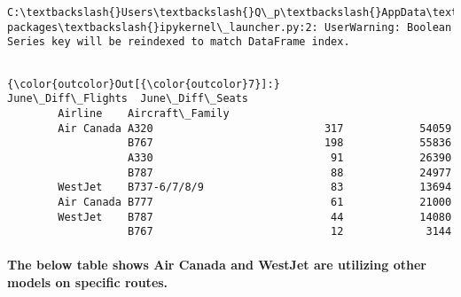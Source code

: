 \documentclass[11pt]{article}
\begin{document}
    \begin{Verbatim}[commandchars=\\\{\}]
C:\textbackslash{}Users\textbackslash{}Q\_p\textbackslash{}AppData\textbackslash{}Local\textbackslash{}Continuum\textbackslash{}anaconda3\textbackslash{}lib\textbackslash{}site-packages\textbackslash{}ipykernel\_launcher.py:2: UserWarning: Boolean Series key will be reindexed to match DataFrame index.
  

    \end{Verbatim}

\begin{Verbatim}[commandchars=\\\{\}]
{\color{outcolor}Out[{\color{outcolor}7}]:}                             June\_Diff\_Flights  June\_Diff\_Seats
        Airline    Aircraft\_Family                                    
        Air Canada A320                           317            54059
                   B767                           198            55836
                   A330                            91            26390
                   B787                            88            24977
        WestJet    B737-6/7/8/9                    83            13694
        Air Canada B777                            61            21000
        WestJet    B787                            44            14080
                   B767                            12             3144
\end{Verbatim}
            
    \paragraph{The below table shows Air Canada and WestJet are utilizing
other models on specific
routes.}\label{the-below-table-shows-air-canada-and-westjet-are-utilizing-other-models-on-specific-routes.}
\end{document}
